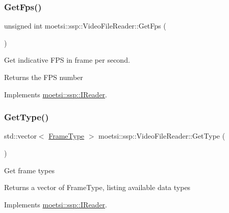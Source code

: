 \subsubsection{\texorpdfstring{Get\+Fps()}{GetFps()}}
{\footnotesize\ttfamily unsigned int moetsi\+::ssp\+::\+Video\+File\+Reader\+::\+Get\+Fps (\begin{DoxyParamCaption}{ }\end{DoxyParamCaption})\hspace{0.3cm}{\ttfamily [virtual]}}

Get indicative F\+PS in frame per second. \begin{DoxyReturn}{Returns}
the F\+PS number 
\end{DoxyReturn}


Implements \hyperlink{classmoetsi_1_1ssp_1_1IReader_a9f6a8650ca290b011b8e5451eeae9f32}{moetsi\+::ssp\+::\+I\+Reader}.

\mbox{\label{classmoetsi_1_1ssp_1_1VideoFileReader_a9d47af47299c5fccf766ac2d848a561b}} 
\subsubsection{\texorpdfstring{Get\+Type()}{GetType()}}
{\footnotesize\ttfamily std\+::vector$<$ \hyperlink{namespacemoetsi_1_1ssp_a46efdfa2cd5a28ead465dcc8006b5a87}{Frame\+Type} $>$ moetsi\+::ssp\+::\+Video\+File\+Reader\+::\+Get\+Type (\begin{DoxyParamCaption}{ }\end{DoxyParamCaption})\hspace{0.3cm}{\ttfamily [virtual]}}

Get frame types \begin{DoxyReturn}{Returns}
a vector of Frame\+Type, listing available data types 
\end{DoxyReturn}


Implements \hyperlink{classmoetsi_1_1ssp_1_1IReader_a4116c1931fde7bd66133934ffdca1cce}{moetsi\+::ssp\+::\+I\+Reader}.

\mbox{\label{classmoetsi_1_1ssp_1_1VideoFileReader_ad98a532db8b1e2c3879df274b2efb082}} 
